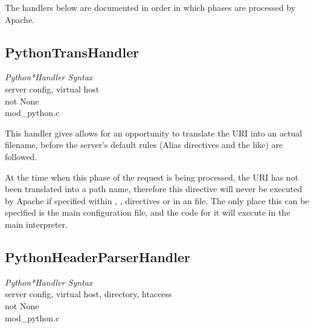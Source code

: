  The handlers below are documented in order in
which phases are processed by Apache.

\subsection{PythonTransHandler\label{dir-handlers-th}}

\emph{Python*Handler Syntax}\\
server config, virtual host\\
not None\\
mod_python.c

This handler gives allows for an opportunity to translate the URI into
an actual filename, before the server's default rules (Alias
directives and the like) are followed.

\begin{notice}
  At the time when this phase of the request is being processed, the
  URI has not been translated into a path name, therefore this
  directive will never be executed by Apache if specified within
  , ,  directives or
  in an  file. The only place this can be specified is
  the main configuration file, and the code for it will execute in the
  main interpreter.
\end{notice}

\subsection{PythonHeaderParserHandler\label{dir-handlers-hph}}

\emph{Python*Handler Syntax}\\
server config, virtual host, directory, htaccess\\
not None\\
mod_python.c

